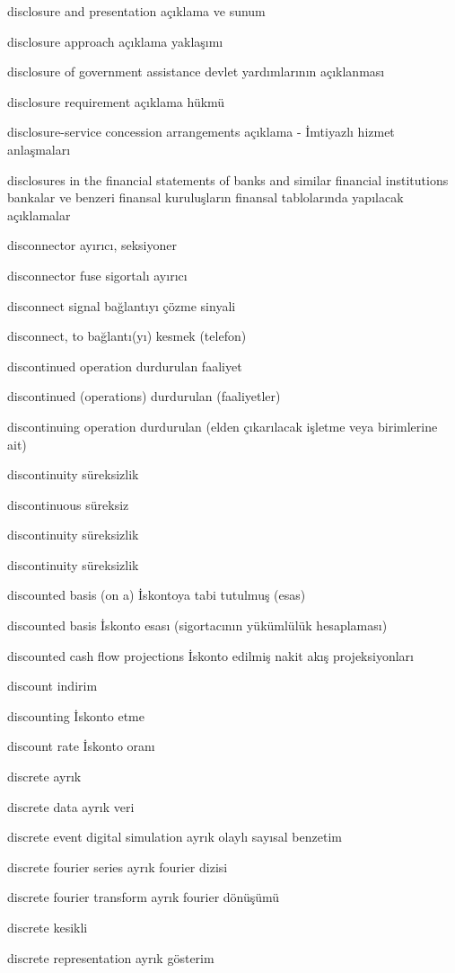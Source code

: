 \documentclass[12pt,fleqn]{article}\usepackage{../../common}
\begin{document}
disclosure and presentation açıklama ve sunum

disclosure approach açıklama yaklaşımı

disclosure of government assistance devlet yardımlarının açıklanması

disclosure requirement açıklama hükmü

disclosure-service concession arrangements açıklama - İmtiyazlı hizmet anlaşmaları

disclosures in the financial statements of banks and similar financial institutions bankalar ve benzeri finansal kuruluşların finansal tablolarında yapılacak açıklamalar

disconnector ayırıcı, seksiyoner

disconnector fuse sigortalı ayırıcı

disconnect signal bağlantıyı çözme sinyali

disconnect, to bağlantı(yı) kesmek (telefon)

discontinued operation durdurulan faaliyet

discontinued (operations) durdurulan (faaliyetler)

discontinuing operation durdurulan (elden çıkarılacak işletme veya birimlerine ait)

discontinuity süreksizlik

discontinuous süreksiz

discontinuity süreksizlik

discontinuity süreksizlik

discounted basis (on a) İskontoya tabi tutulmuş (esas)

discounted basis İskonto esası (sigortacının yükümlülük hesaplaması)

discounted cash flow projections İskonto edilmiş nakit akış projeksiyonları

discount indirim

discounting İskonto etme

discount rate İskonto oranı

discrete ayrık

discrete data ayrık veri

discrete event digital simulation ayrık olaylı sayısal benzetim

discrete fourier series ayrık fourier dizisi

discrete fourier transform ayrık fourier dönüşümü

discrete kesikli

discrete representation ayrık gösterim
\end{document}
